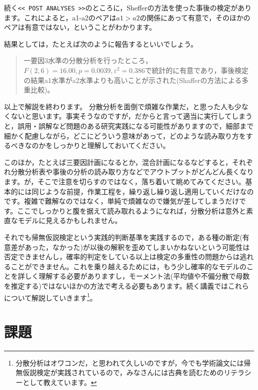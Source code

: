 \documentclass{ltjbook}
\begin{document}
続く\verb|<< POST ANALYSES >>|のところに，Shefferの方法を使った事後の検定があります。これによると，a1-a2のペアは$a1 > a2$の関係にあって有意で，そのほかのペアは有意ではない，ということがわかります。

結果としては，たとえば次のように報告するといいでしょう。
\begin{quote}
	一要因3水準の分散分析を行ったところ，$F(2,6)=16.00,p=0.0039,\varepsilon^2=0.386$で統計的に有意であり，事後検定の結果a1水準がa2水準よりも高いことが示された(Shafferの方法による多重比較)。
\end{quote}

以上で解説を終わります。
分散分析を面倒で煩雑な作業だ，と思った人も少なくないと思います。事実そうなのですが，だからと言って適当に実行してしまうと，誤用・誤解など問題のある研究実践になる可能性がありますので，細部まで細かく配慮しながら，どこにどういう意味があって，どのような読み取り方をするべきなのかをしっかりと理解しておいてください。

このほか，たとえば三要因計画になるとか，混合計画になるなどすると，それぞれ分散分析表や事後の分析の読み取り方などでアウトプットがどんどん長くなります。が，そこで注意を切らすのではなく，落ち着いて眺めてみてください。基本的には同じような前提，作業工程を，繰り返し繰り返し適用していくだけなのです。複雑で難解なのではなく，単純で煩雑なので嫌気が差してしまうだけです。ここでしっかりと腹を据えて読み取れるようになれば，分散分析は意外と素直なモデルに見えるかもしれません。

それでも帰無仮説検定という実践的判断基準を実践するので，ある種の断定(有意差があった，なかった)が以後の解釈を歪めてしまいかねないという可能性は否定できませんし，確率的判定をしている以上は検定の多重性の問題からは逃れることができません。これを乗り越えるためには，もう少し確率的なモデルのことを詳しく理解する必要がありますし，モーメント法(平均値や不偏分散で母数を推定する)ではないほかの方法で考える必要もあります。続く講義ではこれらについて解説していきます\footnote{分散分析はオワコンだ，と思われて久しいのですが，今でも学術論文には帰無仮説検定が実践されているので，みなさんには古典を読むためのリテラシーとして教えています。}。
\section{課題}
\end{document}
